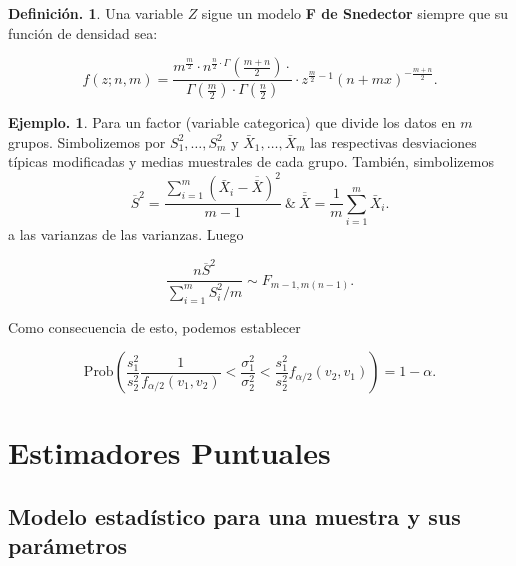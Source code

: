 \documentclass[]{book}
\theoremstyle{definition}
\newtheorem{definition}{Definición.}[chapter]
\theoremstyle{definition}
\newtheorem{example}{Ejemplo.}[chapter]
\theoremstyle{definition}
\theoremstyle{remark}
\begin{document}
\begin{definition}
\protect\hypertarget{def:unnamed-chunk-168}{}{\label{def:unnamed-chunk-168} }
Una variable \(Z\) sigue un modelo \textbf{F de Snedector} siempre
que su función de densidad sea:

\begin{equation}
f(z;n,m)=\frac{m^{\frac{m}{2}} \cdot n^{\frac{n}{2} \cdot
\Gamma}\left(\frac{m+n}{2}\right) \cdot}{\Gamma\left(\frac{m}{2}\right) \cdot
\Gamma\left(\frac{n}{2}\right)} \cdot z^{\frac{m}{2}-1}(n+mx)^{-\frac{m+n}{2}}.
\end{equation}
\end{definition}

\begin{example}
\protect\hypertarget{exm:unnamed-chunk-169}{}{\label{exm:unnamed-chunk-169} }
Para un factor (variable categorica) que divide los datos en \(m\) grupos.
Simbolizemos por \(S_1^2,\ldots, S_m^2\) y \(\bar{X}_1, \ldots, \bar{X}_m\) las
respectivas desviaciones típicas modificadas y medias muestrales de cada grupo.
También, simbolizemos
\begin{equation*}
\overline{S}^{2}=\frac{\sum_{i=1}^{m}\left(\bar{X}_{i}-\overline{\bar{X}}\right)^{2}}{m-1} \ \& \ \overline{\bar{X}}=\frac{1}{m} \sum_{i=1}^{m} \bar{X}_{i}.
\end{equation*}
a las varianzas de las varianzas. Luego

\begin{equation}
 \frac{n\overline{S}^{2} }{\sum_{i=1}^{m} S_{i}^{2} / m} \sim F_{m-1, m(n-1)}.
 \end{equation}

Como consecuencia de esto, podemos establecer

\[ \mbox{Prob} 
\left(\frac{s_{1}^{2}}{s_{2}^{2}}\frac{1}{f_{\alpha /2}
(v_{1},v_{2})}< \frac{\sigma_{1}^{2}}{\sigma_{2}^{2}}<\frac{s_{1}^{2}}{s_{2}^{2}}f_{\alpha / 2}(v_{2}, v_{1}) \right)= 1-\alpha. \]
\end{example}

\hypertarget{puntual}{%
\chapter{Estimadores Puntuales}\label{puntual}}

\hypertarget{modelo-estaduxedstico-para-una-muestra-y-sus-paruxe1metros}{%
\section{Modelo estadístico para una muestra y sus parámetros}\label{modelo-estaduxedstico-para-una-muestra-y-sus-paruxe1metros}}
\end{document}
